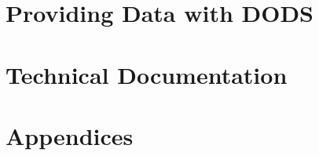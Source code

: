 \documentclass{dods-book}
\begin{document}
\part{Providing Data with DODS}





\part{Technical Documentation}



\part{Appendices}
\appendix





%


\begin{acronym}

\end{acronym}




\printindex
\end{document}
